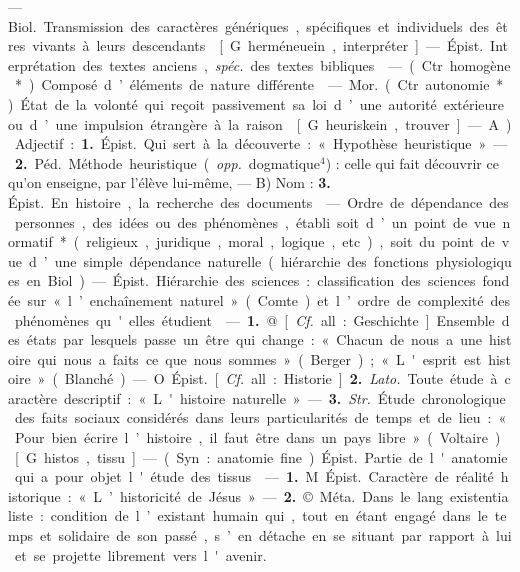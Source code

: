 \begin{itemize}[leftmargin=1cm, label=, itemsep=1pt]
 — \si{Biol.} Transmission des
caractères génériques, spécifiques et
individuels des êtres vivants à leurs
descendants.

 [G. herméneuein, interpréter]. — \si{Épist.} Interprétation des
textes anciens, {\it spéc.} des textes
bibliques.

 — (Ctr. homogène*).
Composé d’éléments de nature différente.

 — \si{Mor.} (Ctr. autonomie*).
État de la volonté qui reçoit passivement sa loi d’une autorité extérieure ou d’une impulsion étrangère
à la raison.

 [G. heuriskein, trouver].
— A) Adjectif : {\bf 1.} \si{Épist.} Qui sert à
la découverte : « Hypothèse heuristique ». — {\bf 2.} \si{Péd.} Méthode heuristique ({\it opp.} dogmatique$^4$) : celle qui
fait découvrir ce qu’on enseigne, par
l'élève lui-même, — B) Nom : {\bf 3.}
\si{Épist.} En histoire, la recherche des
documents.

 — Ordre de dépendance
des personnes, des idées ou des phénomènes, établi soit d’un point de
vue normatif* (religieux, juridique,
moral, logique, etc.), soit du point
de vue d’une simple dépendance
naturelle (hiérarchie des fonctions
physiologiques en Biol). — \si{Épist.}
Hiérarchie des sciences : classification des sciences fondée sur « l’enchaînement naturel » (Comte) et
l’ordre de complexité des phénomènes qu'elles étudient.

 — {\bf 1.} @ [{\it Cf.} all. : Geschichte]
Ensemble des états par lesquels
passe un être qui change : « Chacun
de nous a une histoire qui nous a
faits ce que nous sommes » (Berger);
« L'esprit est histoire » (Blanché).
— O. \si{Épist.} [{\it Cf.} all. : Historie]. {\bf 2.}
{\it Lato.} Toute étude à caractère descriptif : « L'histoire naturelle ». —
 {\bf 3.} {\it Str.} Étude chronologique des
faits sociaux considérés dans leurs
particularités de temps et de lieu :
« Pour bien écrire l’histoire, il faut
être dans un pays libre » (Voltaire).

 [G. histos, tissu]. — (Syn. :
anatomie fine). \si{Épist.} Partie de
l'anatomie qui a pour objet l'étude
des tissus.

 — {\bf 1.} M. \si{Épist.} Caractère de
réalité historique : « L’historicité de
Jésus ». — {\bf 2.} ©. \si{Méta.} Dans le lang.
existentialiste : condition de l’existant humain qui, tout en étant
engagé dans le temps et solidaire
de son passé, s’en détache en se
% 
situant par rapport à lui et se
projette librement vers l'avenir.


\end{itemize}
